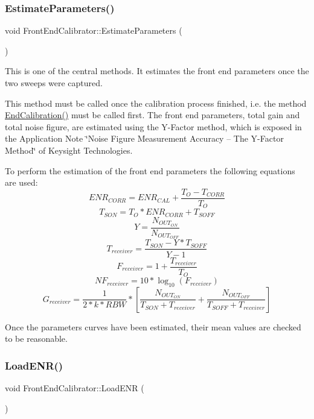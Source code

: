\subsubsection{\texorpdfstring{Estimate\+Parameters()}{EstimateParameters()}}
{\footnotesize\ttfamily void Front\+End\+Calibrator\+::\+Estimate\+Parameters (\begin{DoxyParamCaption}{ }\end{DoxyParamCaption})}



This is one of the central methods. It estimates the front end parameters once the two sweeps were captured. 

This method must be called once the calibration process finished, i.\+e. the method {\ttfamily \hyperlink{classFrontEndCalibrator_a4ba6971b00b7736b80e04a5f9ca784dc}{End\+Calibration()}} must be called first. The front end parameters, total gain and total noise figure, are estimated using the Y-\/\+Factor method, which is exposed in the Application Note \char`\"{}\+Noise Figure Measurement Accuracy – The Y-\/\+Factor Method\char`\"{} of Keysight Technologies.

To perform the estimation of the front end parameters the following equations are used\+: \[ ENR_{CORR}=ENR_{CAL}+\frac{T_{O}-T_{CORR}}{T_{O}} \] \[ T_{SON}=T_{O}*ENR_{CORR}+T_{SOFF} \] \[ Y=\frac{N_{OUT_{ON}}}{N_{OUT_{OFF}}} \] \[ T_{receiver}=\frac{T_{SON}-Y*T_{SOFF}}{Y-1} \] \[ F_{receiver}=1+\frac{T_{receiver}}{T_O} \] \[ NF_{receiver}=10*\log_{10}(F_{receiver}) \] \[ G_{receiver}=\frac{1}{2*k*RBW}*\left[\frac{N_{OUT_{ON}}}{T_{SON}+T_{receiver}}+\frac{N_{OUT_{OFF}}}{T_{SOFF}+T_{receiver}}\right] \]

Once the parameters\textquotesingle{} curves have been estimated, their mean values are checked to be reasonable. \mbox{\label{classFrontEndCalibrator_af166e90f4fe0dfd7cdf825b88d33a479}} 
\subsubsection{\texorpdfstring{Load\+E\+N\+R()}{LoadENR()}}
{\footnotesize\ttfamily void Front\+End\+Calibrator\+::\+Load\+E\+NR (\begin{DoxyParamCaption}{ }\end{DoxyParamCaption})}



